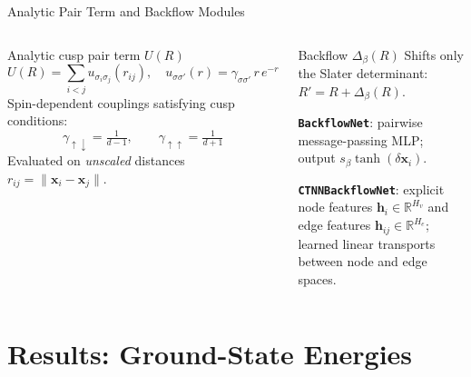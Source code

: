 \documentclass[aspectratio=169,10pt]{beamer}
\begin{document}
\begin{frame}{Analytic Pair Term and Backflow Modules}
  \begin{columns}[T]
      \begin{block}{Analytic cusp pair term $U(R)$}
        \[
          U(R)=\sum_{i<j} u_{\sigma_i\sigma_j}(r_{ij}),\quad
          u_{\sigma\sigma'}(r)=\gamma_{\sigma\sigma'}\,r\,e^{-r}
        \]
        Spin-dependent couplings satisfying cusp conditions:
        \[
          \gamma_{\uparrow\downarrow}=\tfrac{1}{d-1},\qquad
          \gamma_{\uparrow\uparrow}=\tfrac{1}{d+1}
        \]
        Evaluated on \emph{unscaled} distances $r_{ij}=\|\mathbf x_i-\mathbf x_j\|$.
      \end{block}
      \begin{block}{Backflow $\Delta_\beta(R)$}
        Shifts only the Slater determinant: $R'=R+\Delta_\beta(R)$.

        \smallskip
        \textbf{\texttt{BackflowNet}}: pairwise message-passing MLP;
        output $s_\beta\tanh(\delta\mathbf x_i)$.

        \smallskip
        \textbf{\texttt{CTNNBackflowNet}}: explicit node features $\mathbf h_i\in\mathbb R^{H_v}$ and
        edge features $\mathbf h_{ij}\in\mathbb R^{H_e}$; learned
        linear transports between node and edge spaces.
      \end{block}
  \end{columns}
\end{frame}

\section{Results: Ground-State Energies}
\end{document}
